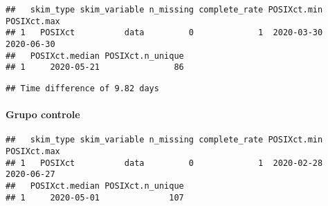 \documentclass[
]{article}
\newenvironment{Shaded}{\begin{snugshade}}{\end{snugshade}}
\newcommand{\AttributeTok}[1]{\textcolor[rgb]{0.77,0.63,0.00}{#1}}
\newcommand{\FunctionTok}[1]{\textcolor[rgb]{0.00,0.00,0.00}{#1}}
\newcommand{\NormalTok}[1]{#1}
\newcommand{\SpecialCharTok}[1]{\textcolor[rgb]{0.00,0.00,0.00}{#1}}
\newcommand{\StringTok}[1]{\textcolor[rgb]{0.31,0.60,0.02}{#1}}
\begin{document}
\begin{Shaded}
\end{Shaded}

\begin{verbatim}
##   skim_type skim_variable n_missing complete_rate POSIXct.min POSIXct.max
## 1   POSIXct          data         0             1  2020-03-30  2020-06-30
##   POSIXct.median POSIXct.n_unique
## 1     2020-05-21               86
\end{verbatim}

\begin{Shaded}
\end{Shaded}

\begin{verbatim}
## Time difference of 9.82 days
\end{verbatim}

\hypertarget{grupo-controle-1}{%
\paragraph{Grupo controle}\label{grupo-controle-1}}

\begin{Shaded}
\end{Shaded}

\begin{verbatim}
##   skim_type skim_variable n_missing complete_rate POSIXct.min POSIXct.max
## 1   POSIXct          data         0             1  2020-02-28  2020-06-27
##   POSIXct.median POSIXct.n_unique
## 1     2020-05-01              107
\end{verbatim}
\end{document}
